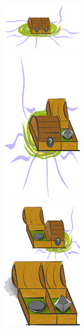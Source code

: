 \includegraphics[width=0.3\textwidth]{img/both-box-closed-portal} \\
\includegraphics[width=0.3\textwidth]{img/left-box-closed-portal-die} \\
\includegraphics[width=0.3\textwidth]{img/right-box-closed-portal-coin} \\
\includegraphics[width=0.3\textwidth]{img/box-both-open-coin-die}
